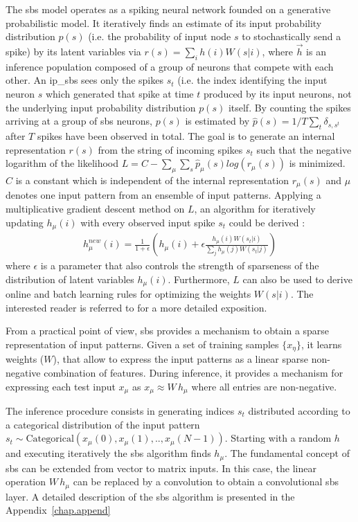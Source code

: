 The \gls{sbs} model operates as a spiking neural network founded on a generative probabilistic model. It iteratively finds an estimate of
its input probability distribution $p(s)$ (i.e. the probability of
input node $s$ to stochastically send a spike) by its latent variables
via $r(s) = \sum_i h(i) W(s|i)$, 
where $\vec{h}$ is an inference
population composed of a group of neurons that compete with each
other. An \gls{ip_sbs} sees only the spikes $s_t$ (i.e. the
index identifying the input neuron $s$ which generated that spike at
time $t$ produced by its input neurons, not the underlying input
probability distribution $p(s)$ itself. By counting the spikes
arriving at a group of \gls{sbs} neurons, $p(s)$ is estimated by
$\hat{p}(s) = 1/T \sum_t \delta_{s,s^t}$ after $T$ spikes have been
observed in total. The goal is to generate an internal representation
$r(s)$ from the string of incoming spikes $s_t$ such that the negative
logarithm of the likelihood
$L = C - \sum_\mu \sum_s \hat{p}_\mu(s) log\left( r_\mu(s) \right)$ is
minimized. $C$ is a constant which is independent of the internal
representation $r_\mu(s)$ and $\mu$ denotes one input pattern from an
ensemble of input patterns. Applying a multiplicative gradient descent
method on $L$, an algorithm for iteratively updating $h_\mu(i)$ with
every observed input spike $s_t$ could be derived
\cite{ernst2007efficient}:
\begin{eqnarray} \label{eq:sbs_update}
h_\mu^{new}(i) = \frac{1}{1+\epsilon} \left(h_\mu(i) + \epsilon \frac{h_\mu(i) W(s_t|i) }{\sum_j h_\mu(j) W(s_t|j)} \right) 
\end{eqnarray}
where $\epsilon$ is a parameter that also controls the strength of sparseness of the distribution of latent variables $h_\mu(i)$. Furthermore, $L$ can also be used to derive online and batch learning rules for optimizing the weights $W(s|i)$. The interested reader is referred to \cite{ernst2007efficient} for a more detailed exposition.

From a practical point of view, \gls{sbs} provides a mechanism to obtain a sparse representation of input patterns. Given a set of
training samples $\{x_\eta\}$, it learns weights ($W$), that allow
to express the input patterns as a linear sparse non-negative combination
of features.  During inference, it provides a mechanism for expressing
each test input $x_\mu$ as $x_\mu \approx W\, h_\mu$ where all
entries are non-negative.

The inference procedure consists in generating indices $s_t$
distributed according to a categorical distribution of the input pattern
$s_t \sim \mathrm{Categorical}(x_{\mu}(0), x_{\mu}(1), ..,
x_{\mu}(N-1))$. Starting with a random $h$ and executing
iteratively  the \gls{sbs} algorithm finds
$h_{\mu}$. The fundamental concept of \gls{sbs} can be extended from vector to matrix
inputs. In this case, the linear operation $W\, h_\mu$ can be replaced by a
convolution to obtain a convolutional \gls{sbs} layer. A detailed description of the \gls{sbs} algorithm is presented in the Appendix~\ref{chap.append}

